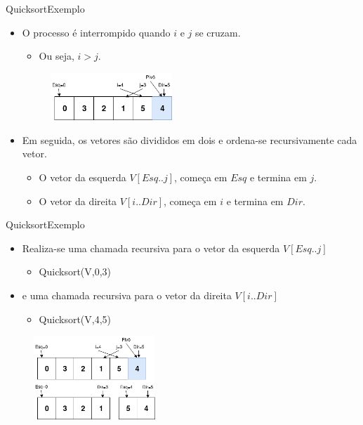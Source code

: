 \documentclass[aspectratio=169]{beamer}
\begin{document}

\begin{frame}{Quicksort}{Exemplo}
\begin{itemize}
 \item O processo é interrompido quando $i$ e $j$ se cruzam.
 \begin{itemize}
 \item Ou seja, $i > j$.
 \end{itemize} 

\begin{figure}[!h]
  \centering
  \includegraphics[width=130pt]{imgs/quick/quick21.png}
  \label{fig_quick21}
\end{figure}

\item Em seguida, os vetores são divididos em dois e ordena-se recursivamente cada vetor.
\begin{itemize}
\item O vetor da esquerda $V[Esq .. j]$, começa em $Esq$ e termina em $j$.
\item O vetor da direita $V[i .. Dir]$, começa em $i$ e termina em $Dir$.
\end{itemize}
\end{itemize}
\end{frame}


\begin{frame}{Quicksort}{Exemplo}
\begin{itemize}
 \item Realiza-se uma chamada recursiva para o vetor da esquerda $V[Esq .. j]$
 \begin{itemize}
 \item Quicksort(V,0,3)
 \end{itemize}
 \item e uma chamada recursiva para o vetor da direita $V[i .. Dir]$
 \begin{itemize}
 \item Quicksort(V,4,5)
 \end{itemize} 
\end{itemize}


\begin{figure}[!h]
  \centering
  \includegraphics[width=130pt]{imgs/quick/quick22.png}
  \label{fig_quick22}
\end{figure}

\end{frame}
\end{document}
